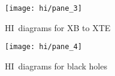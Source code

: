 \begin{figure}[p]
	{\vspace*{-0cm}\hspace*{-3cm}\texttt{[image: hi/pane\_3]}}
	\caption{\acs{HI}~diagrams for XB to XTE}\label{fig:hi_pane_3}
\end{figure}

\begin{figure}[p]
	{\vspace*{-0cm}\hspace*{-3cm}\texttt{[image: hi/pane\_4]}}
	\caption{\acs{HI}~diagrams for black holes}\label{fig:hi_pane_4}
\end{figure}